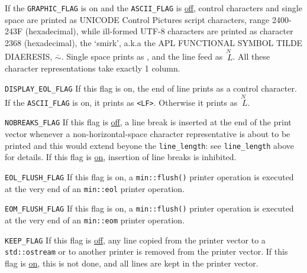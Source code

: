 \documentclass[12pt]{article}
\makeatletter
\newcommand{\ttnbmkey}[2]{{\tt #1}\index{#1@{\tt #1}!#2}}
\newcommand{\EOL}{\penalty \exhyphenpenalty}
\newenvironment{indpar}[1][0.3in]%
	{\begin{list}{}%
		     {\setlength{\itemsep}{0in}%
		      \setlength{\topsep}{0in}%
		      \setlength{\parsep}{1ex}%
		      \setlength{\labelwidth}{#1}%
		      \setlength{\leftmargin}{#1}%
		      \addtolength{\leftmargin}{\labelsep}}%
	 \item}%
	{\end{list}}
\newenvironment{itemlist}[1][1.2in]%
	{\begin{list}{}{\setlength{\labelwidth}{#1}%
		        \setlength{\leftmargin}{\labelwidth}%
		        \addtolength{\leftmargin}{+0.2in}%
		        \renewcommand{\makelabel}[1]{##1\hfill}}}%
	{\end{list}}
\makeatother
\begin{document}
\begin{indpar}
\begin{itemlist}[1.4in]
If the {\tt GRAPHIC\_FLAG} is on and the {\tt ASCII\_FLAG} is
\underline{off}, control characters and single space are
printed as UNICODE Control Pictures script characters,
range 2400-243F (hexadecimal), while ill-formed UTF-8 characters
are printed as character 2368 (hexadecimal), the `smirk', a.k.a
the APL FUNCTIONAL SYMBOL TILDE DIAERESIS, $\stackrel{..}{\sim}$.
Single space prints as {\tt \textvisiblespace}, and the
line feed as {\tiny $\stackrel{\textstyle N~}{~L}$}.
All these character representations take exactly 1 column.

\item[\ttnbmkey{DISPLAY\_EOL\_FLAG}{{\tt min::printer\_parameters} flag}]
If this flag is on, the end of line prints as a control
character.  If the {\tt ASCII\_FLAG} is on, it prints as
{\tt <LF>}.  Otherwise it prints as {\tiny $\stackrel{\textstyle N~}{~L}$}.

\item[\ttnbmkey{NOBREAKS\_FLAG}{{\tt min::printer\_parameters} flag}]
If this flag is \underline{off}, a line break is inserted
at the end of the print vector whenever a non-horizontal-space
character representative is about to be printed and this would extend
beyone the {\tt line\_length}: see {\tt line\_length} above for
details.  If this flag is \underline{on}, insertion of line breaks
is inhibited.

\item[\ttnbmkey{EOL\_FLUSH\_FLAG}{{\tt min::printer\_parameters} flag}]
If this flag is on, a {\tt min::flush()} printer operation is
executed at the very end of an {\tt min::\EOL eol} printer operation.

\item[\ttnbmkey{EOM\_FLUSH\_FLAG}{{\tt min::printer\_parameters} flag}]
If this flag is on, a {\tt min::flush()} printer operation is
executed at the very end of an {\tt min::\EOL eom} printer operation.

\item[\ttnbmkey{KEEP\_FLAG}{{\tt min::printer\_parameters} flag}]
If this flag is \underline{off}, any line copied from the printer
vector to a {\tt std::ostream} or to another printer is removed from
the printer vector.  If this flag is \underline{on}, this is not done,
and all lines are kept in the printer vector.

\end{itemlist}\end{indpar}
\end{document}
